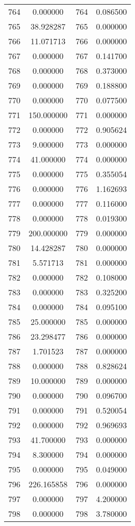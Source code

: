 \documentclass[12pt]{article}
\begin{document}
\begin{longtable}{@{}cccc@{}}
764 & 0.000000 & 764 & 0.086500 \\
765 & 38.928287 & 765 & 0.000000 \\
766 & 11.071713 & 766 & 0.000000 \\
767 & 0.000000 & 767 & 0.141700 \\
768 & 0.000000 & 768 & 0.373000 \\
769 & 0.000000 & 769 & 0.188800 \\
770 & 0.000000 & 770 & 0.077500 \\
771 & 150.000000 & 771 & 0.000000 \\
772 & 0.000000 & 772 & 0.905624 \\
773 & 9.000000 & 773 & 0.000000 \\
774 & 41.000000 & 774 & 0.000000 \\
775 & 0.000000 & 775 & 0.355054 \\
776 & 0.000000 & 776 & 1.162693 \\
777 & 0.000000 & 777 & 0.116000 \\
778 & 0.000000 & 778 & 0.019300 \\
779 & 200.000000 & 779 & 0.000000 \\
780 & 14.428287 & 780 & 0.000000 \\
781 & 5.571713 & 781 & 0.000000 \\
782 & 0.000000 & 782 & 0.108000 \\
783 & 0.000000 & 783 & 0.325200 \\
784 & 0.000000 & 784 & 0.095100 \\
785 & 25.000000 & 785 & 0.000000 \\
786 & 23.298477 & 786 & 0.000000 \\
787 & 1.701523 & 787 & 0.000000 \\
788 & 0.000000 & 788 & 0.828624 \\
789 & 10.000000 & 789 & 0.000000 \\
790 & 0.000000 & 790 & 0.096700 \\
791 & 0.000000 & 791 & 0.520054 \\
792 & 0.000000 & 792 & 0.969693 \\
793 & 41.700000 & 793 & 0.000000 \\
794 & 8.300000 & 794 & 0.000000 \\
795 & 0.000000 & 795 & 0.049000 \\
796 & 226.165858 & 796 & 0.000000 \\
797 & 0.000000 & 797 & 4.200000 \\
798 & 0.000000 & 798 & 3.780000 \\

\end{longtable}
\end{document}
